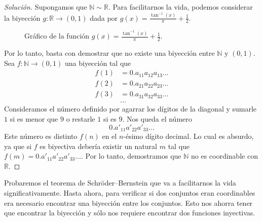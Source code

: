 \begin{proof}[Solución]
    Supongamos que $\mathbb{N} \sim \mathbb{R}$. Para facilitarnos la vida, podemos considerar la biyección $g: \mathbb{R} \to (0, 1)$ dada por $g(x) = \frac{\tan^{-1} (x)}{\pi} + \frac{1}{2}$.

    \begin{figure}[H]
        \centering
        \caption{Gráfico de la función $g(x) = \frac{\tan^{-1}(x)}{\pi} + \frac{1}{2}$.}
    \end{figure}

    Por lo tanto, basta con demostrar que no existe una biyección entre $\mathbb{N}$ y $(0, 1)$. Sea $f: \mathbb{N} \to (0, 1)$ una biyección tal que
    \begin{align*}
        f(1) &= 0.a_{11}a_{12}a_{13}\dots \\
        f(2) &= 0.a_{21}a_{22}a_{23}\dots \\
        f(3) &= 0.a_{31}a_{32}a_{33}\dots \\
             &\dots
    \end{align*}
    Consideramos el número definido por agarrar los dígitos de la diagonal y sumarle $1$ si es menor que $9$ o restarle $1$ si es $9$. Nos queda el número
    $$
        0.a'_{11}a'_{22}a'_{33}\dots
    $$
    Este número es distinto $f(n)$ en el $n$-ésimo dígito decimal. Lo cual es absurdo, ya que si $f$ es biyectiva debería existir un natural $m$ tal que $f(m) = 0.a'_{11}a'_{22}a'_{33}\dots$. Por lo tanto, demostramos que $\mathbb{N}$ no es coordinable con $\mathbb{R}$.
\end{proof}

Probaremos el teorema de Schröder–Bernstein que va a facilitarnos la vida significativamente. Hasta ahora, para verificar si dos conjuntos eran coordinables era necesario encontrar una biyección entre los conjuntos. Esto nos ahorra tener que encontrar la biyección y sólo nos requiere encontrar dos funciones inyectivas.

